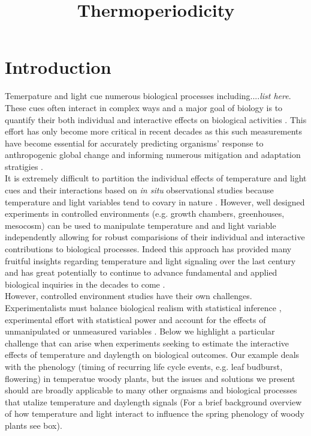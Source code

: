 \documentclass[11pt]{article}
\title{Thermoperiodicity}
\begin{document}
\section{Introduction}
Temerpature and light cue numerous biological processes including....\textit{list here}\citep{}. These cues often interact in complex ways and a major goal of biology is to quantify their both individual and interactive effects on biological activities \citep{}. This effort has only become more critical in recent decades as this such measurements have become essential for accurately predicting organisms' response to anthropogenic global change and informing numerous mitigation and adaptation stratigies \citep{}.\\

It is extremely difficult to partition the individual effects of temperature and light cues and their interactions based on \textit{in situ} observational studies  because temperature and light variables tend to covary in nature \citep{}. However, well designed experiments in controlled environments (e.g. growth chambers, greenhouses, mesocosm) can be used to manipulate temperature and and light variable independently allowing for robust comparisions of their individual and interactive contributions to biological processes. Indeed this approach has provided many fruitful insights regarding temperature and light signaling over the last century \citep{} and has great potentially to continue to advance fundamental and applied biological inquiries in the decades to come \citep{}.\\

However, controlled environment studies have their own challenges. Experimentalists must balance biological realism with statistical inference \citep{}, experimental effort with statistical power \citep{} and account for the effects of unmanipulated or unmeasured variables \citep{}. Below we highlight a particular challenge that can arise when experiments seeking to estimate the interactive effects of temperature and daylength on biological outcomes. Our example deals with the phenology (timing of recurring life cycle events, e.g. leaf budburst, flowering) in temperatue woody plants, but the issues and solutions we present should are broadly applicable to many other orgnaisms and biological processes that utalize temperature and daylength signals \citep{} (For a brief background overview of how temperature and light interact to influence the spring phenology of woody plants see box). \\
\end{document}
